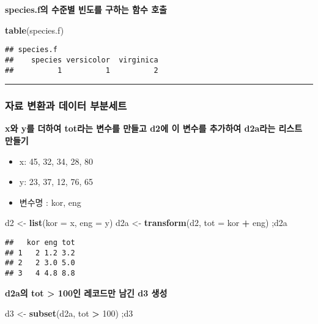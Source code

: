 \documentclass[]{article}
\newenvironment{Shaded}{\begin{snugshade}}{\end{snugshade}}
\newcommand{\KeywordTok}[1]{\textcolor[rgb]{0.13,0.29,0.53}{\textbf{#1}}}
\newcommand{\DataTypeTok}[1]{\textcolor[rgb]{0.13,0.29,0.53}{#1}}
\newcommand{\DecValTok}[1]{\textcolor[rgb]{0.00,0.00,0.81}{#1}}
\newcommand{\StringTok}[1]{\textcolor[rgb]{0.31,0.60,0.02}{#1}}
\newcommand{\OperatorTok}[1]{\textcolor[rgb]{0.81,0.36,0.00}{\textbf{#1}}}
\newcommand{\NormalTok}[1]{#1}
\providecommand{\tightlist}{%
  \setlength{\itemsep}{0pt}\setlength{\parskip}{0pt}}
\begin{document}
\textbf{species.f의 수준별 빈도를 구하는 함수 호출}

\begin{Shaded}
\begin{Highlighting}[]
\KeywordTok{table}\NormalTok{(species.f)}
\end{Highlighting}
\end{Shaded}

\begin{verbatim}
## species.f
##    species versicolor  virginica 
##          1          1          2
\end{verbatim}

\begin{center}\rule{0.5\linewidth}{\linethickness}\end{center}

\subsubsection{자료 변환과 데이터 부분세트}\label{---}

\textbf{x와 y를 더하여 tot라는 변수를 만들고 d2에 이 변수를 추가하여
d2a라는 리스트 만들기}

\begin{itemize}
\tightlist
\item
  x: 45, 32, 34, 28, 80
\item
  y: 23, 37, 12, 76, 65
\item
  변수명 : kor, eng
\end{itemize}

\begin{Shaded}
\begin{Highlighting}[]
\NormalTok{d2 <-}\StringTok{ }\KeywordTok{list}\NormalTok{(}\DataTypeTok{kor =}\NormalTok{ x, }\DataTypeTok{eng =}\NormalTok{ y)}
\NormalTok{d2a <-}\StringTok{ }\KeywordTok{transform}\NormalTok{(d2, }\DataTypeTok{tot =}\NormalTok{ kor }\OperatorTok{+}\StringTok{ }\NormalTok{eng) ;d2a}
\end{Highlighting}
\end{Shaded}

\begin{verbatim}
##   kor eng tot
## 1   2 1.2 3.2
## 2   2 3.0 5.0
## 3   4 4.8 8.8
\end{verbatim}

\textbf{d2a의 tot \textgreater{} 100인 레코드만 남긴 d3 생성}

\begin{Shaded}
\begin{Highlighting}[]
\NormalTok{d3 <-}\StringTok{ }\KeywordTok{subset}\NormalTok{(d2a, tot }\OperatorTok{>}\StringTok{ }\DecValTok{100}\NormalTok{) ;d3}
\end{Highlighting}
\end{Shaded}
\end{document}
